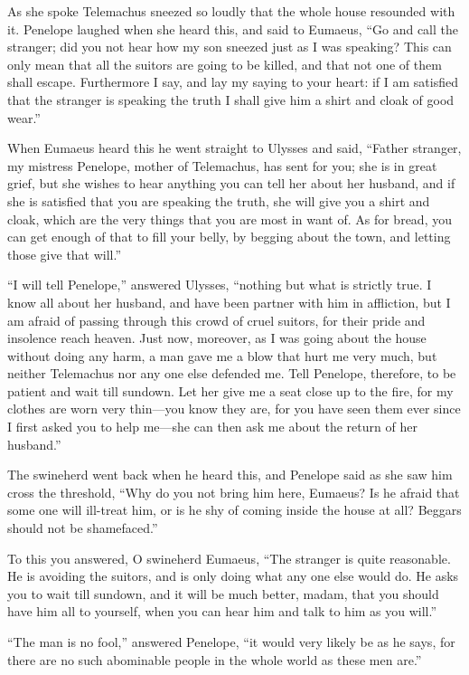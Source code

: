 As she spoke Telemachus sneezed so loudly that the whole house resounded with
it. Penelope laughed when she heard this, and said to Eumaeus, “Go and call the
stranger; did you not hear how my son sneezed just as I was speaking? This can
only mean that all the suitors are going to be killed, and that not one of them
shall escape. Furthermore I say, and lay my saying to your heart: if I am
satisfied that the stranger is speaking the truth I shall give him a shirt and
cloak of good wear.”

When Eumaeus heard this he went straight to Ulysses and said, “Father stranger,
my mistress Penelope, mother of Telemachus, has sent for you; she is in great
grief, but she wishes to hear anything you can tell her about her husband, and
if she is satisfied that you are speaking the truth, she will give you a shirt
and cloak, which are the very things that you are most in want of. As for
bread, you can get enough of that to fill your belly, by begging about the
town, and letting those give that will.”

“I will tell Penelope,” answered Ulysses, “nothing but what is strictly true. I
know all about her husband, and have been partner with him in affliction, but I
am afraid of passing through this crowd of cruel suitors, for their pride and
insolence reach heaven. Just now, moreover, as I was going about the house
without doing any harm, a man gave me a blow that hurt me very much, but
neither Telemachus nor any one else defended me. Tell Penelope, therefore, to
be patient and wait till sundown. Let her give me a seat close up to the fire,
for my clothes are worn very thin—you know they are, for you have seen them
ever since I first asked you to help me—she can then ask me about the return of
her husband.”

The swineherd went back when he heard this, and Penelope said as she saw him
cross the threshold, “Why do you not bring him here, Eumaeus? Is he afraid that
some one will ill-treat him, or is he shy of coming inside the house at all?
Beggars should not be shamefaced.”

To this you answered, O swineherd Eumaeus, “The stranger is quite reasonable.
He is avoiding the suitors, and is only doing what any one else would do. He
asks you to wait till sundown, and it will be much better, madam, that you
should have him all to yourself, when you can hear him and talk to him as you
will.”

“The man is no fool,” answered Penelope, “it would very likely be as he says,
for there are no such abominable people in the whole world as these men are.”

